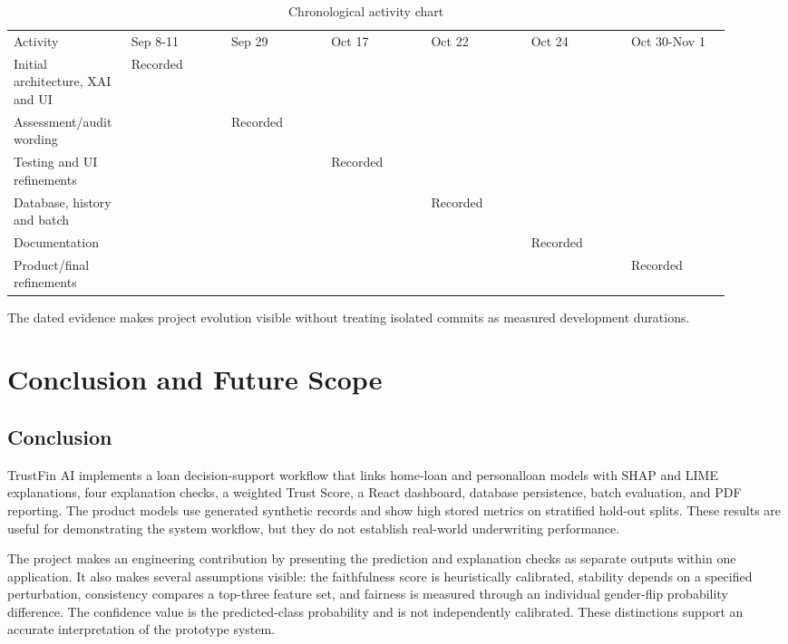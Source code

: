 \documentclass[12pt,a4paper]{report}
\begin{document}
\begin{longtable}{p{0.131\linewidth}p{0.131\linewidth}p{0.131\linewidth}p{0.131\linewidth}p{0.131\linewidth}p{0.131\linewidth}p{0.131\linewidth}}
\caption{Chronological activity chart}\\

Activity & Sep 8-11 & Sep 29 & Oct 17 & Oct 22 & Oct 24 & Oct 30-Nov 1\\
Initial architecture, XAI and UI & Recorded &  &  &  &  & \\
Assessment/audit wording &  & Recorded &  &  &  & \\
Testing and UI refinements &  &  & Recorded &  &  & \\
Database, history and batch &  &  &  & Recorded &  & \\
Documentation &  &  &  &  & Recorded & \\
Product/final refinements &  &  &  &  &  & Recorded\\
\end{longtable}
The dated evidence makes project evolution visible without treating isolated commits as measured development durations.

\chapter{Conclusion and Future Scope}
\section{Conclusion}
TrustFin AI implements a loan decision-support workflow that links home-loan and personalloan models with SHAP and LIME explanations, four explanation checks, a weighted Trust Score, a React dashboard, database persistence, batch evaluation, and PDF reporting. The product models use generated synthetic records and show high stored metrics on stratified hold-out splits. These results are useful for demonstrating the system workflow, but they do not establish real-world underwriting performance.

The project makes an engineering contribution by presenting the prediction and explanation checks as separate outputs within one application. It also makes several assumptions visible: the faithfulness score is heuristically calibrated, stability depends on a specified perturbation, consistency compares a top-three feature set, and fairness is measured through an individual gender-flip probability difference. The confidence value is the predicted-class probability and is not independently calibrated. These distinctions support an accurate interpretation of the prototype system.
\end{document}
